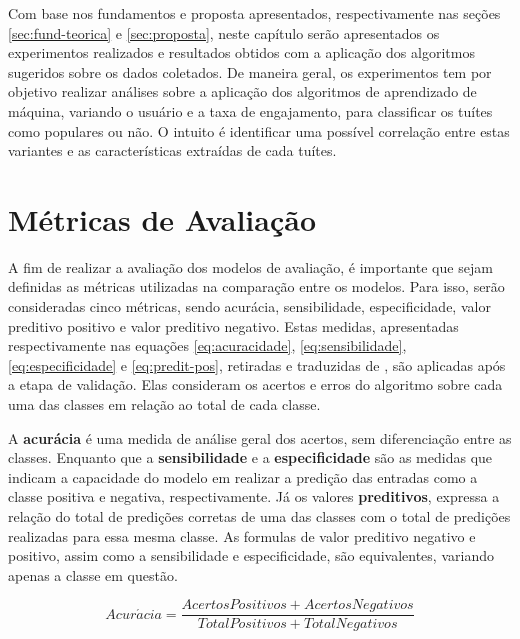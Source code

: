 \documentclass[oneside,openright,12pt]{ufsm_2015} %
\begin{document}
    \par Com base nos fundamentos e proposta apresentados, respectivamente nas seções \ref{sec:fund-teorica} e \ref{sec:proposta}, neste capítulo serão apresentados os experimentos realizados e resultados obtidos com a aplicação dos algoritmos sugeridos sobre os dados coletados. De maneira geral, os experimentos tem por objetivo realizar análises sobre a aplicação dos algoritmos de aprendizado de máquina, variando o usuário e a taxa de engajamento, para classificar os tuítes como populares ou não. O intuito é identificar uma possível correlação entre estas variantes e as características extraídas de cada tuítes.
    

\section{Métricas de Avaliação}
\label{sec:class-metricas}

    \par A fim de realizar a avaliação dos modelos de avaliação, é importante que sejam definidas as métricas utilizadas na comparação entre os modelos. Para isso, serão consideradas cinco métricas, sendo acurácia, sensibilidade, especificidade, valor preditivo positivo e valor preditivo negativo. Estas medidas, apresentadas respectivamente nas equações \ref{eq:acuracidade}, \ref{eq:sensibilidade}, \ref{eq:especificidade} e \ref{eq:predit-pos}, retiradas e traduzidas de \cite{book:han:11}, são aplicadas após a etapa de validação. Elas consideram os acertos e erros do algoritmo sobre cada uma das classes em relação ao total de cada classe.
    
    \par A \textbf{acurácia} é uma medida de análise geral dos acertos, sem diferenciação entre as classes. Enquanto que a \textbf{sensibilidade} e a \textbf{especificidade} são as medidas que indicam a capacidade do modelo em realizar a predição das entradas como a classe positiva e negativa, respectivamente. Já os valores \textbf{preditivos}, expressa a relação do total de predições corretas de uma das classes com o total de predições realizadas para essa mesma classe. As formulas de valor preditivo negativo e positivo, assim como a sensibilidade e especificidade, são equivalentes, variando apenas a classe em questão.
    
    \begin{equation} \label{eq:acuracidade}
    Acur\acute{a}cia = \frac{AcertosPositivos + AcertosNegativos}{TotalPositivos + TotalNegativos}
    \end{equation}
    
\end{document}
